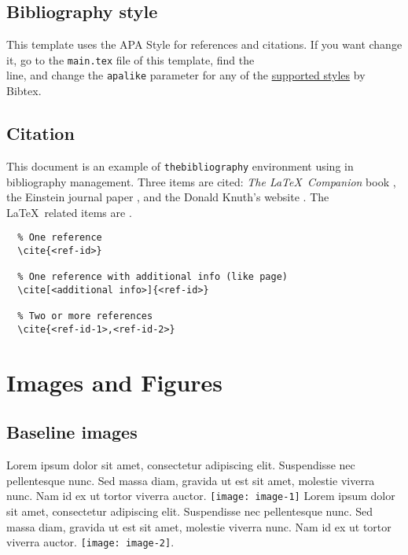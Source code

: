 \subsection{Bibliography style}

This template uses the APA Style for references and citations. If you want change it, go to the \verb|main.tex| file of this template, find the\\\verb|| line, and change the \verb|apalike| parameter for any of the \href{https://www.overleaf.com/learn/latex/Bibtex_bibliography_styles}{supported styles} by Bibtex.

\subsection{Citation}

This document is an example of \texttt{thebibliography} environment using  in bibliography management. Three items are cited: \textit{The \LaTeX\ Companion} book \cite{latexcompanion}, the Einstein journal paper \cite{einstein}, and the Donald Knuth's website \cite[p.150]{knuthwebsite}. The \LaTeX\ related items are \cite{latexcompanion,knuthwebsite}.

\begin{lstlisting}
  % One reference
  \cite{<ref-id>}

  % One reference with additional info (like page)
  \cite[<additional info>]{<ref-id>}

  % Two or more references
  \cite{<ref-id-1>,<ref-id-2>}
\end{lstlisting}

\section{Images and Figures}

\subsection{Baseline images}

Lorem ipsum dolor sit amet, consectetur adipiscing elit. Suspendisse nec pellentesque nunc. Sed massa diam, gravida ut est sit amet, molestie viverra nunc. Nam id ex ut tortor viverra auctor. \texttt{[image: image-1]} Lorem ipsum dolor sit amet, consectetur adipiscing elit. Suspendisse nec pellentesque nunc. Sed massa diam, gravida ut est sit amet, molestie viverra nunc. Nam id ex ut tortor viverra auctor. \texttt{[image: image-2]}.

